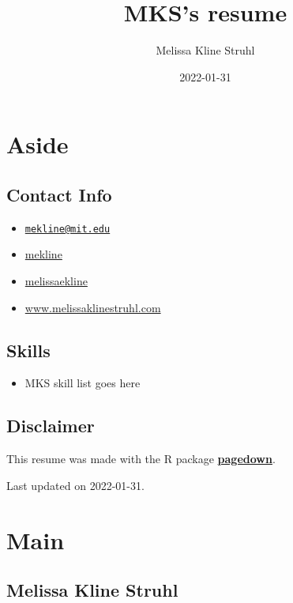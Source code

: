 \documentclass[
]{article}
\title{MKS's resume}
\author{Melissa Kline Struhl}
\date{2022-01-31}
\providecommand{\tightlist}{%
  \setlength{\itemsep}{0pt}\setlength{\parskip}{0pt}}
\begin{document}
\maketitle

\hypertarget{aside}{%
\section{Aside}\label{aside}}

\hypertarget{contact}{%
\subsection{Contact Info}\label{contact}}

\begin{itemize}
\tightlist
\item
  \href{mailto:mekline@mit.edu}{\nolinkurl{mekline@mit.edu}}
\item
  \href{https://github.com/mekline}{mekline}
\item
  \href{https://twitter.com/melissaekline}{melissaekline}
\item
  \url{www.melissaklinestruhl.com}
\end{itemize}

\hypertarget{skills}{%
\subsection{Skills}\label{skills}}

\begin{itemize}
\tightlist
\item
  MKS skill list goes here
\end{itemize}

\hypertarget{disclaimer}{%
\subsection{Disclaimer}\label{disclaimer}}

This resume was made with the R package
\href{https://github.com/rstudio/pagedown}{\textbf{pagedown}}.

Last updated on 2022-01-31.

\hypertarget{main}{%
\section{Main}\label{main}}

\hypertarget{title}{%
\subsection{Melissa Kline Struhl}\label{title}}
\end{document}
